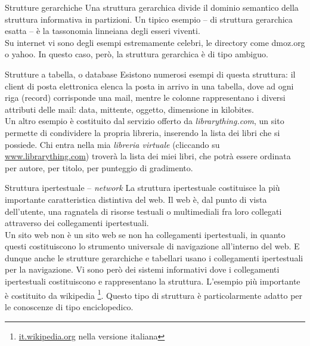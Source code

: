 \documentclass[pdf,mpa]{prosper}
\begin{document}
\begin{slide}{Strutture gerarchiche}
Una struttura gerarchica divide il dominio semantico della struttura informativa in partizioni. Un tipico esempio -- di struttura gerarchica esatta -- è la tassonomia linneiana degli esseri viventi.\\
Su internet vi sono degli esempi estremamente celebri, le directory come dmoz.org o yahoo. In questo caso, però, la struttura gerarchica è di tipo ambiguo.
\end{slide}

\begin{slide}{Strutture a tabella, o database}
Esistono numerosi esempi di questa struttura: il client di posta elettronica elenca la posta in arrivo in una tabella, dove ad ogni riga (record) corrisponde una mail, mentre le colonne rappresentano i diversi attributi delle mail: data, mittente, oggetto, dimensione in kilobites.\\
Un altro esempio è costituito dal servizio offerto da \textit{librarything.com}, un sito permette di condividere la propria libreria, inserendo la lista dei libri che si possiede. Chi entra nella mia \textit{libreria virtuale} (cliccando su \href{http://www.librarything.com/catalog.php?view=sweetdreamerit}{www.librarything.com}) troverà la lista dei miei libri, che potrà essere ordinata per autore, per titolo, per punteggio di gradimento.

\end{slide}

\begin{slide}{Struttura ipertestuale -- \textit{network}}
La struttura ipertestuale costituisce la più importante caratteristica distintiva del web. Il web è, dal punto di vista dell'utente, una ragnatela di risorse testuali o multimediali fra loro collegati attraverso dei collegamenti ipertestuali.\\
Un sito web non è un sito web se non ha collegamenti ipertestuali, in quanto questi costituiscono lo strumento universale di navigazione all'interno del web. E dunque anche le strutture gerarchiche e tabellari usano i collegamenti ipertestuali per la navigazione. Vi sono però dei sistemi informativi dove i collegamenti ipertestuali costituiscono e rappresentano la struttura. L'esempio più importante è costituito da wikipedia \footnote{\href{http://it.wikipedia.org}{it.wikipedia.org} nella versione italiana}. Questo tipo di struttura è particolarmente adatto per le conoscenze di tipo enciclopedico.
\end{slide}
\end{document}
